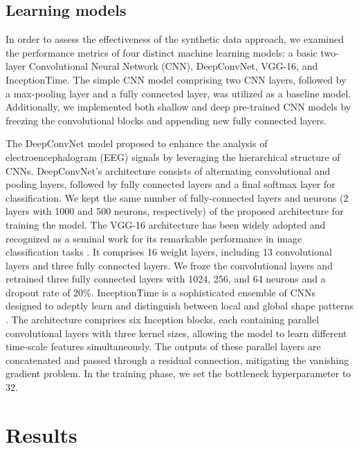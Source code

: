 \documentclass{article}
\begin{document}
\subsection{Learning models}
In order to assess the effectiveness of the synthetic data approach, we examined the performance metrics of four distinct machine learning models: a basic two-layer Convolutional Neural Network (CNN), DeepConvNet, VGG-16, and InceptionTime. The simple CNN model comprising two CNN layers, followed by a max-pooling layer and a fully connected layer, was utilized as a baseline model. Additionally, we implemented both shallow and deep pre-trained CNN models by freezing the convolutional blocks and appending new fully connected layers.

\par The DeepConvNet model \cite{schirrmeister2017deep} proposed to enhance the analysis of electroencephalogram (EEG) signals by leveraging the hierarchical structure of CNNs. DeepConvNet's architecture consists of alternating convolutional and pooling layers, followed by fully connected layers and a final softmax layer for classification. We kept the same number of fully-connected layers and neurons (2 layers with 1000 and 500 neurons, respectively) of the proposed architecture for training the model. The VGG-16 architecture has been widely adopted and recognized as a seminal work for its remarkable performance in image classification tasks \cite{simonyan2014very}. It comprises 16 weight layers, including 13 convolutional layers and three fully connected layers. We froze the convolutional layers and retrained three fully connected layers with 1024, 256, and 64 neurons and a dropout rate of 20\%. InceptionTime is a sophisticated ensemble of CNNs designed to adeptly learn and distinguish between local and global shape patterns \cite{rafiei2022automated}. The architecture comprises six Inception blocks, each containing parallel convolutional layers with three kernel sizes, allowing the model to learn different time-scale features simultaneously. The outputs of these parallel layers are concatenated and passed through a residual connection, mitigating the vanishing gradient problem. In the training phase, we set the bottleneck hyperparameter to 32.


\section{Results}
\end{document}
